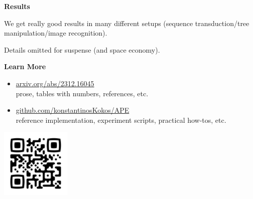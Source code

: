 \documentclass{article}
\newcommand{\sectionfont}{\fontsize{34}{34}\selectfont\setlength{\parskip}{1\baselineskip}}
\newcommand{\nfont}{\fontsize{21}{22}\selectfont\setlength{\parskip}{1\baselineskip}}
\newcommand{\light}[1]{\textcolor{gray!90}{#1}}
\begin{document}
\begin{minipage}[t]{0.286\textwidth}
		\sectionfont
		\vspace{\parskip}
		\textbf{Results}
		\nfont
		
		We get really good results in many different setups (sequence transduction/tree manipulation/image recognition).\\
		\vspace{-2\baselineskip}
		\begin{flushright}
				\light{Details omitted for suspense (and space economy).}
		\end{flushright}
		
		\sectionfont
		\vspace{\parskip}
		\textbf{Learn More}
		\nfont
		
		\begin{itemize}[topsep=-0.5\baselineskip]
			\item \url{arxiv.org/abs/2312.16045}\\
			prose, tables with numbers, references, etc.
			\item \url{github.com/konstantinosKokos/APE}\\
			reference implementation, experiment scripts, practical how-tos, etc.\\
		\end{itemize}
		
		\vspace{\parskip}\vspace{\parskip}
		\centering\includegraphics[width=0.25\textwidth]{qr.png}
	\end{minipage}%
\end{document}
